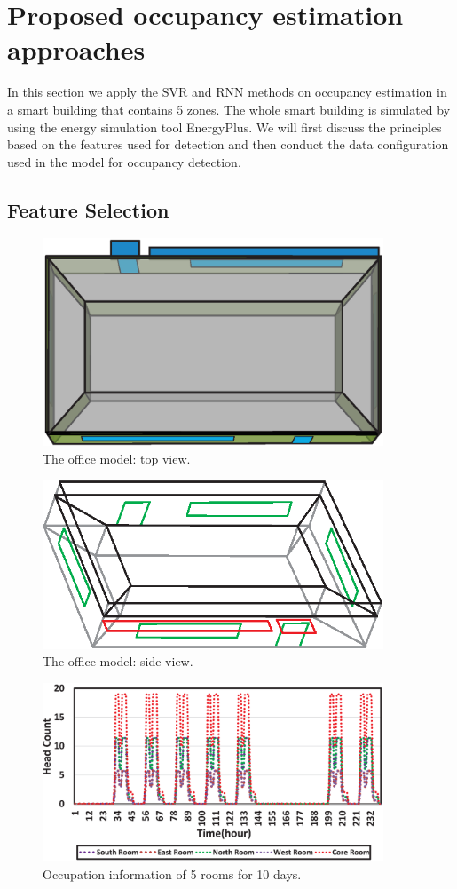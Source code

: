 \section{Proposed occupancy estimation approaches}
\label{sec:proposed_methods}
In this section we apply the SVR and RNN methods on occupancy estimation in a smart building that contains 5 zones. The whole smart building is simulated by using the energy simulation tool EnergyPlus. We will first discuss the principles based on the features used for detection and then conduct the data configuration used in the model for occupancy detection.
\subsection{Feature Selection}
\begin{figure}[h]
\centering
\includegraphics[width=4in]{./Pics/TopView2.eps}
\caption{The office model: top view.}
\label{fig:office1}
\end{figure}

\begin{figure}[h]
\centering
\includegraphics[width=4in]{./Pics/SideView.eps}
\caption{The office model: side view.}
\label{fig:office2}
\end{figure}

\begin{figure}[h]
\centering
\includegraphics[width=4in]{./Pics/Headcount.eps}
\caption{Occupation information of 5 rooms for 10 days.}
\label{fig:Headcount}
\end{figure}

